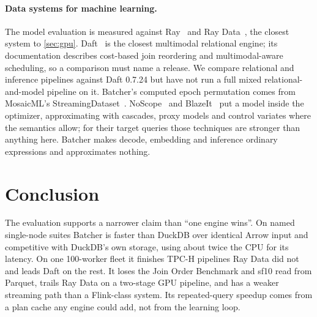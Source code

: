 \documentclass[10pt,twocolumn,letterpaper]{article}   %
\newcommand{\sys}{Batcher}
\begin{document}
\paragraph{Data systems for machine learning.} The model evaluation is measured against
Ray~\cite{moritz2018ray} and Ray Data~\cite{luan2025streamingbatch}, the closest system to
\cref{sec:gpu}. Daft~\cite{daft} is the closest multimodal relational engine; its documentation
describes cost-based join reordering and multimodal-aware scheduling, so a comparison must name
a release. We compare relational and inference pipelines against Daft 0.7.24 but have not run a
full mixed relational-and-model pipeline on it. \sys{}'s computed epoch permutation comes from
MosaicML's StreamingDataset~\cite{mosaicstreaming}. NoScope~\cite{kang2017noscope} and
BlazeIt~\cite{kang2020blazeit} put a model inside the optimizer, approximating with cascades,
proxy models and control variates where the semantics allow; for their target queries those
techniques are stronger than anything here. \sys{} makes decode, embedding and inference
ordinary expressions and approximates nothing.

\section{Conclusion}

The evaluation supports a narrower claim than ``one engine wins''. On named single-node suites
\sys{} is faster than DuckDB over identical Arrow input and competitive with DuckDB's own
storage, using about twice the CPU for its latency. On one 100-worker fleet it finishes TPC-H
pipelines Ray Data did not and leads Daft on the rest. It loses the Join Order Benchmark and
sf10 read from Parquet, trails Ray Data on a two-stage GPU pipeline, and has a weaker streaming
path than a Flink-class system. Its repeated-query speedup comes from a plan cache any engine
could add, not from the learning loop.
\end{document}
